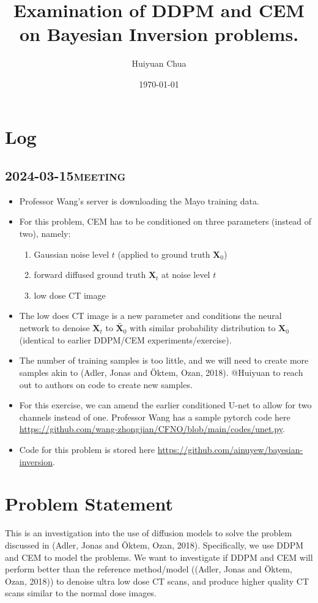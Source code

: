 \documentclass[a4paper, 11pt]{article}
\author{Huiyuan Chua}
\date{\today}
\title{Examination of DDPM and CEM on Bayesian Inversion problems.}
\begin{document}
\maketitle
\tableofcontents


\section{Log}
\label{sec:orgf73a410}
\subsection{2024-03-15\hfill{}\textsc{meeting}}
\label{sec:org0e38636}
\begin{itemize}
\item Professor Wang's server is downloading the Mayo training data.
\item For this problem, CEM has to be conditioned on three parameters (instead of two), namely:
\begin{enumerate}
\item Gaussian noise level \(t\) (applied to ground truth \(\bm{X}_0\))
\item forward diffused ground truth \(\bm{X}_t\) at noise level \(t\)
\item low dose CT image
\end{enumerate}
\item The low does CT image is a new parameter and conditions the neural network to denoise \(\bm{X}_t\) to \(\widetilde{\bm{X}_0}\) with similar probability distribution to \(\bm{X}_0\) (identical to earlier DDPM/CEM experiments/exercise).
\item The number of training samples is too little, and we will need to create more samples akin to (Adler, Jonas and Öktem, Ozan, 2018). @Huiyuan to reach out to authors on code to create new samples.
\item For this exercise, we can amend the earlier conditioned U-net to allow for two channels instead of one. Professor Wang has a sample pytorch code here \url{https://github.com/wang-zhongjian/CFNO/blob/main/codes/unet.py}.
\item Code for this problem is stored here \url{https://github.com/ainuyew/bayesian-inversion}.
\end{itemize}


\section{Problem Statement}
\label{sec:org944691d}
This is an investigation into the use of diffusion models to solve the problem discussed in (Adler, Jonas and Öktem, Ozan, 2018). Specifically, we use DDPM and CEM to model the problems. We want to investigate if DDPM and CEM will perform better than the reference method/model ((Adler, Jonas and Öktem, Ozan, 2018)) to denoise ultra low dose CT scans, and produce higher quality CT scans similar to the normal dose images.
\end{document}
